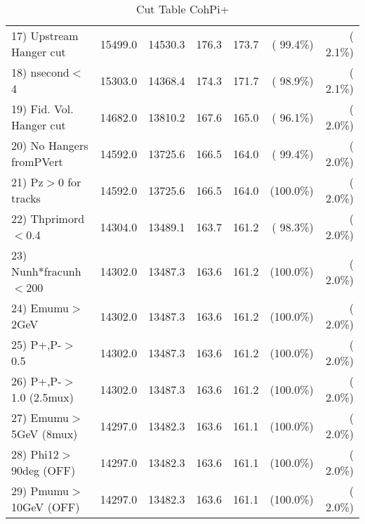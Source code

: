 \begin{table}[h!]
\begin{tabular}{||l||r|r|r|r|r|r||}
 17) Upstream Hanger cut  &      15499.0 &      14530.3 &        176.3 &        173.7 & ( 99.4\%) & (  2.1\%) \\
 18) nsecond$<$4          &      15303.0 &      14368.4 &        174.3 &        171.7 & ( 98.9\%) & (  2.1\%) \\
 19) Fid. Vol. Hanger cut &      14682.0 &      13810.2 &        167.6 &        165.0 & ( 96.1\%) & (  2.0\%) \\
 20) No Hangers fromPVert &      14592.0 &      13725.6 &        166.5 &        164.0 & ( 99.4\%) & (  2.0\%) \\
 21) Pz$>$0 for tracks    &      14592.0 &      13725.6 &        166.5 &        164.0 & (100.0\%) & (  2.0\%) \\
 22) Thprimord$<$0.4      &      14304.0 &      13489.1 &        163.7 &        161.2 & ( 98.3\%) & (  2.0\%) \\
 23) Nunh*fracunh$<$200   &      14302.0 &      13487.3 &        163.6 &        161.2 & (100.0\%) & (  2.0\%) \\
 24) Emumu$>$2GeV         &      14302.0 &      13487.3 &        163.6 &        161.2 & (100.0\%) & (  2.0\%) \\
 25) P+,P-$>$0.5          &      14302.0 &      13487.3 &        163.6 &        161.2 & (100.0\%) & (  2.0\%) \\
 26) P+,P-$>$1.0 (2.5mux) &      14302.0 &      13487.3 &        163.6 &        161.2 & (100.0\%) & (  2.0\%) \\
 27) Emumu$>$5GeV  (8mux) &      14297.0 &      13482.3 &        163.6 &        161.1 & (100.0\%) & (  2.0\%) \\
 28) Phi12$>$90deg  (OFF) &      14297.0 &      13482.3 &        163.6 &        161.1 & (100.0\%) & (  2.0\%) \\
 29) Pmumu$>$10GeV  (OFF) &      14297.0 &      13482.3 &        163.6 &        161.1 & (100.0\%) & (  2.0\%) \\
 \hline
 \hline
 \end{tabular}
 \caption{Cut Table  CohPi+   }
 \label{tab-cutcohjpsi-mumu_cohpip}
 \end{table}
